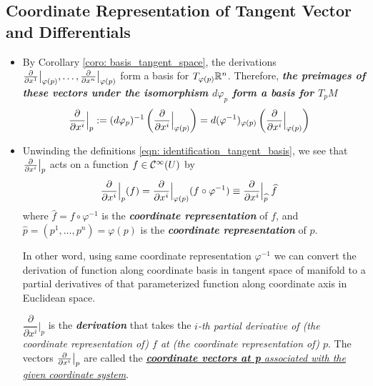 \documentclass[11pt]{article}
\begin{document}
\subsection{Coordinate Representation of Tangent Vector and Differentials}
\begin{itemize}
\item \begin{remark} 
By Corollary \ref{coro: basis_tangent_space}, the derivations $\frac{\partial }{ \partial x^{1}}\big|_{\varphi(p)}, \ldots, \frac{\partial }{ \partial x^{n}}\big|_{\varphi(p)}$ form a basis for $T_{\varphi(p)}{\mathbb R}^n$. Therefore, \emph{\textbf{the preimages of these vectors under the \emph{isomorphism} $d\varphi_p$ form a basis for $T_{p}M$}} 
\begin{align}
\frac{\partial }{ \partial x^{i}}\Bigr|_{p} &:= (d\varphi_{p})^{-1}\left(\frac{\partial }{ \partial x^{i}}\Bigr|_{\varphi(p)}\right) 
= d(\varphi^{-1})_{\varphi(p)}\left(\frac{\partial }{ \partial x^{i}}\Bigr|_{\varphi(p)}\right) \label{eqn: identification_tangent_basis}
\end{align}
\end{remark}

\item  \begin{remark} Unwinding the definitions \eqref{eqn: identification_tangent_basis}, we see that $\frac{\partial }{ \partial x^{i}}\big|_{p}$ acts on a function $f \in {\mathcal C}^{\infty}(U)$ by
\begin{align}
\frac{\partial }{ \partial x^{i}}\Bigr|_{p}(f) &= \frac{\partial }{ \partial x^{i}}\Bigr|_{\varphi(p)}(f \circ \varphi^{-1}) \equiv \frac{\partial }{ \partial x^{i}}\Bigr|_{\widehat{p}}\;\widehat{f}   \label{eqn: coordinate_basis_tangent_vector}
\end{align} where $\widehat{f} = f \circ \varphi^{-1}$ is the \emph{\textbf{coordinate representation}} of $f$, and $\widehat{p} = (p^1, \ldots, p^n) = \varphi(p)$ is the \emph{\textbf{coordinate representation}} of $p$.

In other word, using same coordinate representation $\varphi^{-1}$ we can convert the derivation of function along coordinate basis in tangent space of manifold to a partial derivatives of that parameterized function along coordinate axis in Euclidean space.  
\end{remark}

\begin{definition}
$\dfrac{\partial}{\partial x^{i}}\Bigr|_{p}$ is  the \textbf{\emph{derivation}} that takes the \emph{$i$-th partial derivative of (the coordinate representation of) $f$ at (the coordinate representation of) $p$}. The vectors $\frac{\partial }{ \partial x^{i}}\big|_{p}$ are called the \underline{\emph{\textbf{coordinate vectors at p} associated with the given coordinate system}}.
\end{definition}


\end{itemize}
\end{document}
